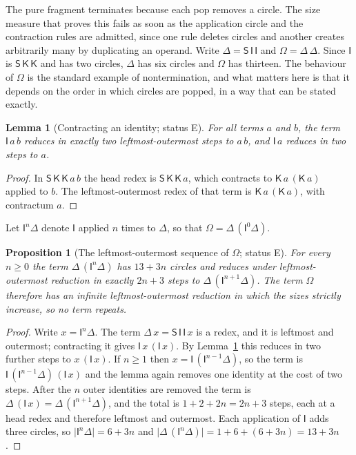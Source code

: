 \documentclass[11pt]{article}
\newtheorem{proposition}[theorem]{Proposition}
\newtheorem{lemma}[theorem]{Lemma}
\theoremstyle{definition}
\theoremstyle{remark}
\newcommand{\cI}{\mathsf{I}}
\newcommand{\cK}{\mathsf{K}}
\newcommand{\cS}{\mathsf{S}}
\newcommand{\size}[1]{\lvert #1\rvert}
\newcommand{\Et}{status E}
\begin{document}
The pure fragment terminates because each pop removes a circle. The size measure that proves this fails as soon as the application circle and the contraction rules are admitted, since one rule deletes circles and another creates arbitrarily many by duplicating an operand. Write $\Delta=\cS\,\cI\,\cI$ and $\Omega=\Delta\,\Delta$. Since $\cI$ is $\cS\,\cK\,\cK$ and has two circles, $\Delta$ has six circles and $\Omega$ has thirteen. The behaviour of $\Omega$ is the standard example of nontermination, and what matters here is that it depends on the order in which circles are popped, in a way that can be stated exactly.

\begin{lemma}[Contracting an identity; \Et]\label{lem:identity}
For all terms $a$ and $b$, the term $\cI\,a\,b$ reduces in exactly two leftmost-outermost steps to $a\,b$, and $\cI\,a$ reduces in two steps to $a$.
\end{lemma}

\begin{proof}
In $\cS\,\cK\,\cK\,a\,b$ the head redex is $\cS\,\cK\,\cK\,a$, which contracts to $\cK\,a\,(\cK\,a)$ applied to $b$. The leftmost-outermost redex of that term is $\cK\,a\,(\cK\,a)$, with contractum $a$.
\end{proof}

Let $\cI^n\Delta$ denote $\cI$ applied $n$ times to $\Delta$, so that $\Omega=\Delta\,(\cI^0\Delta)$.

\begin{proposition}[The leftmost-outermost sequence of $\Omega$; \Et]\label{prop:omega}
For every $n\ge0$ the term $\Delta\,(\cI^n\Delta)$ has $13+3n$ circles and reduces under leftmost-outermost reduction in exactly $2n+3$ steps to $\Delta\,(\cI^{n+1}\Delta)$. The term $\Omega$ therefore has an infinite leftmost-outermost reduction in which the sizes strictly increase, so no term repeats.
\end{proposition}

\begin{proof}
Write $x=\cI^n\Delta$. The term $\Delta\,x=\cS\,\cI\,\cI\,x$ is a redex, and it is leftmost and outermost; contracting it gives $\cI\,x\,(\cI\,x)$. By Lemma~\ref{lem:identity} this reduces in two further steps to $x\,(\cI\,x)$. If $n\ge1$ then $x=\cI\,(\cI^{n-1}\Delta)$, so the term is $\cI\,(\cI^{n-1}\Delta)\,(\cI\,x)$ and the lemma again removes one identity at the cost of two steps. After the $n$ outer identities are removed the term is $\Delta\,(\cI\,x)=\Delta\,(\cI^{n+1}\Delta)$, and the total is $1+2+2n=2n+3$ steps, each at a head redex and therefore leftmost and outermost. Each application of $\cI$ adds three circles, so $\size{\cI^n\Delta}=6+3n$ and $\size{\Delta\,(\cI^n\Delta)}=1+6+(6+3n)=13+3n$.
\end{proof}
\end{document}
